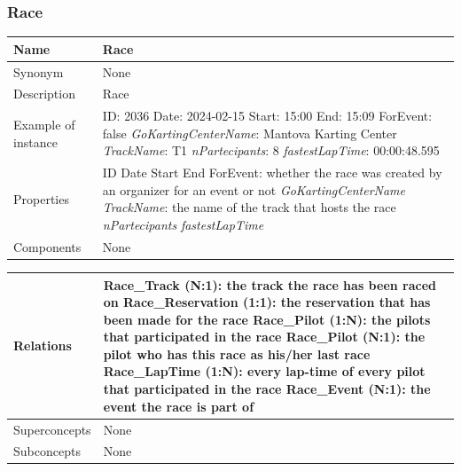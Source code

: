 \documentclass{beamer}
\begin{document}
\begin{frame}
\frametitle{Race}
\begin{table}
\tiny
\begin{tabular}{|p{2cm}|p{6cm}|}
\hline
Name & \textbf{Race} \\
\hline
Synonym & None \\
\hline
Description & Race \\
\hline
Example of instance &
ID: 2036 \newline
Date: 2024-02-15 \newline
Start: 15:00 \newline
End: 15:09 \newline
ForEvent: false \newline
\textit{GoKartingCenterName}: Mantova Karting Center \newline
\textit{TrackName}: T1 \newline
\textit{nPartecipants}: 8 \newline
\textit{fastestLapTime}: 00:00:48.595 \\
\hline
Properties &
ID \newline
Date \newline
Start \newline
End \newline
ForEvent: whether the race was created by an organizer for an event or not \newline
\textit{GoKartingCenterName} \newline
\textit{TrackName}: the name of the track that hosts the race \newline
\textit{nPartecipants} \newline
\textit{fastestLapTime} \\
\hline
Components & None \\
\hline
\end{tabular}
\end{table}
\end{frame}

\begin{frame}
\begin{table}
\tiny
\begin{tabular}{|p{2cm}|p{6cm}|}
\hline
Relations & 
Race\_Track (N:1): the track the race has been raced on \newline
Race\_Reservation (1:1): the reservation that has been made for the race \newline
Race\_Pilot (1:N): the pilots that participated in the race \newline
Race\_Pilot (N:1): the pilot who has this race as his/her last race \newline
Race\_LapTime (1:N): every lap-time of every pilot that participated in the race \newline
Race\_Event (N:1): the event the race is part of \\
\hline
Superconcepts & None \\
\hline
Subconcepts & None \\
\hline
\end{tabular}
\end{table}
\end{frame}
\end{document}
